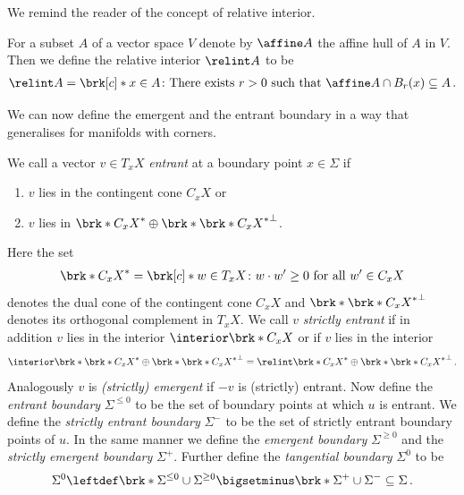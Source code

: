 We remind the reader of the concept of relative interior.
\begin{definition}\label{df:relativeInterior}
  For a subset $A$ of a vector space $V$ denote by $\affine A$ the affine hull of $A$ in $V$. 
  Then we define the relative interior $\relint A$ to be
  \begin{align*}
    \relint A=\brk[c]*{x\in A\colon \text{There exists }r>0\text{ such that }\affine A\cap B_r(x)\subseteq A}\,.
  \end{align*}
\end{definition}
We can now define the emergent and the entrant boundary in a way that generalises
\cite[p.282]{Morse1970} for manifolds with corners.
\begin{definition}\label{df:emergentEntrantBd}
  We call a vector $v\in T_xX$ \emph{entrant} at a boundary point $x\in\Sigma$ if
  \begin{enumerate}
    \item $v$ lies in the contingent cone $C_xX$ or
    \item $v$ lies in $\brk*{C_xX}^*\oplus \brk*{\brk*{C_xX}^*}^\perp$.
  \end{enumerate}
  Here the set
  \begin{align}
    \brk*{C_xX}^*=\brk[c]*{w\in T_xX\colon w\cdot w'\geq0\text{ for all }w'\in C_xX}\label{eq:emergentEntrantBd_dualCone}
  \end{align}
  denotes the dual cone of the contingent cone $C_xX$ and $\brk*{\brk*{C_xX}^*}^\perp$ denotes its orthogonal complement in $T_xX$.
  We call $v$ \emph{strictly entrant} if in addition $v$ lies in the interior $\interior\brk*{C_xX}$ or if $v$ lies in the interior
  $$\interior\brk*{\brk*{C_xX}^*\oplus \brk*{\brk*{C_xX}^*}^\perp}=\relint\brk*{C_xX}^*\oplus \brk*{\brk*{C_xX}^*}^\perp\,.$$
  Analogously $v$ is \emph{(strictly) emergent} if $-v$ is (strictly) entrant.
  Now define the \emph{entrant boundary} $\Sigma^{\leq0}$ to be the set of boundary points at which $u$ is entrant.
  We define the \emph{strictly entrant boundary} $\Sigma^-$ to be the set of strictly entrant boundary points of $u$.
  In the same manner we define the \emph{emergent boundary} $\Sigma^{\geq0}$ and the \emph{strictly emergent boundary} $\Sigma^+$.
  Further define the \emph{tangential boundary} $\Sigma^0$ to be
  \begin{align*}
    \Sigma^0\leftdef\brk*{\Sigma^{\leq0}\cup\Sigma^{\geq0}}\bigsetminus\brk*{\Sigma^+\cup\Sigma^-}\subseteq\Sigma\,.
  \end{align*}
\end{definition}
